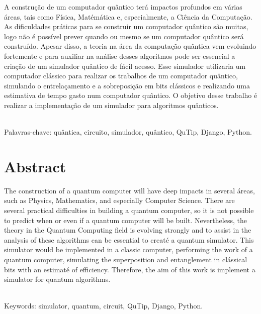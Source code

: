 \documentclass[a4paper, 12pt, oneside]{book}
\begin{document}
\thispagestyle{myheadings}

A construção de um computador quântico terá impactos profundos em várias áreas, tais como Física, Matémática e, especialmente, a Ciência da Computação. As dificuldades práticas para se construir um computador quântico são muitas, logo não é possível prever quando ou mesmo se um computador quântico será construído. Apesar disso, a teoria na área da computação quântica vem evoluindo fortemente e para auxiliar na análise desses algoritmos pode ser essencial a criação de um simulador quântico de fácil acesso. Esse simulador utilizaria um computador clássico para realizar os trabalhos de um computador quântico, simulando o entrelaçamento e a sobreposição em bits clássicos e realizando uma estimativa de tempo gasto num computador quântico. O objetivo desse trabalho é realizar a implementação de um simulador para algoritmos quânticos.

\ \\

Palavras-chave: quântica, circuito, simulador, quântico, QuTip, Django, Python. 


\chapter*{Abstract}

\thispagestyle{myheadings}

The construction of a quantum computer will have deep impacts in several áreas, such as Physics, Mathematics, and especially Computer Science. There are several practical difficulties in building a quantum computer, so it is not possible to predict when or even if a quantum computer will be built. Nevertheless, the theory in the Quantum Computing field is evolving strongly and to assist in the analysis of these algorithms can be essential to creaté a quantum simulator. This simulator would be implemented in a classic computer, performing the work of a quantum computer, simulating the superposition and entanglement in clássical bits with an estimaté of efficiency. Therefore, the aim of this work is implement a simulator for quantum algorithms.

\ \\

Keywords: simulator, quantum, circuit, QuTip, Django, Python.

\end{document}

